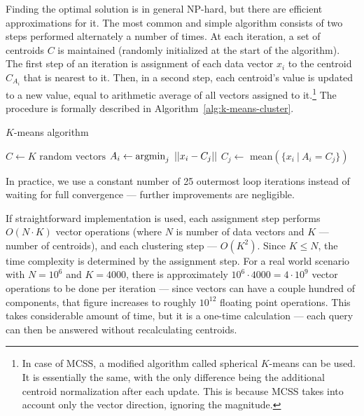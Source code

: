 Finding the optimal solution is in general NP-hard, but there are efficient
approximations for it. The most common and simple algorithm consists of two steps performed 
alternately a number of
times. At each iteration, a set of centroids $C$ is maintained (randomly
initialized at the start of the algorithm). The first
step of an iteration is assignment of each data vector $x_i$ to the
centroid $C_{A_i}$ that
is nearest to it. Then, in a second step, each centroid's value is updated
to a new value, equal to arithmetic average of all vectors assigned to
it.\footnote{
In case of MCSS, a modified algorithm called spherical $K$-means can be used.
It is essentially the same, with the only difference being the additional
centroid normalization after each update. This is because MCSS
takes into account only the vector direction, ignoring the magnitude. 
} The procedure is formally described in Algorithm~\ref{alg:k-means-cluster}.

\begin{algorithm}
	\caption{$K$-means algorithm}
	\begin{algorithmic}
		\State $C \gets K \text{ random vectors}$
		\Repeat
				\State $A_i \gets \operatorname*{argmin}_{j}\ || x_i - C_j || $
			\EndFor
				\State $C_j \gets$ mean$(\{x_i\ |\ A_i = C_j\}) $
			\EndFor

		\State {}
	\end{algorithmic}
\label{alg:k-means-cluster}
\end{algorithm}

In practice, we use a constant number of 25 outermost loop iterations
instead of waiting for full convergence --- further improvements are negligible.

If straightforward implementation is used, each assignment step performs
$O(N \cdot K)$ vector operations (where $N$ is number of data vectors and
$K$ --- number of centroids), and each clustering step --- $O(K^2)$. Since
$K \le N$, the time complexity is determined by the assignment step. For a real
world scenario with $N = 10^6$ and $K = 4000$, there is approximately
$10^6 \cdot 4000 = 4 \cdot 10^{9}$ vector operations to be done per iteration --- since vectors
can have a couple hundred of components, that figure increases to roughly
$10^{12}$ floating point operations. This takes considerable amount of time,
but it is a one-time calculation --- each query can then be answered without
recalculating centroids.


